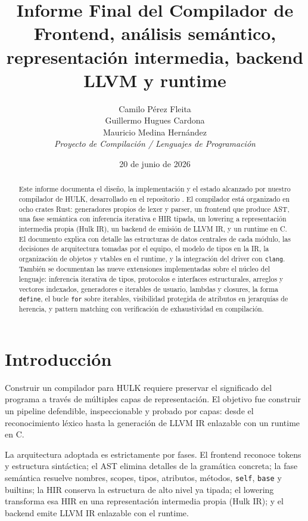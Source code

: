 \documentclass[12pt,letterpaper]{article}
\title{Informe Final del Compilador de \hulk{}\\
\large Frontend, análisis semántico, representación intermedia, backend LLVM y runtime}
\author{
Camilo Pérez Fleita\\
Guillermo Hugues Cardona\\
Mauricio Medina Hernández\\[0.5em]
\textit{Proyecto de Compilación / Lenguajes de Programación}
}
\date{20 de junio de 2026}
\newcommand{\repo}[1]{\texttt{\detokenize{#1}}}
\newcommand{\hulk}{\textsc{HULK}}
\newcommand{\src}[1]{\texttt{#1}}
\begin{document}
\maketitle

\begin{abstract}
Este informe documenta el diseño, la implementación y el estado alcanzado por nuestro compilador de \hulk{}, desarrollado en el repositorio \repo{mauricio04mh/hulk-compiler}. El compilador está organizado en ocho crates Rust: generadores propios de lexer y parser, un frontend que produce AST, una fase semántica con inferencia iterativa e HIR tipada, un lowering a representación intermedia propia (Hulk IR), un backend de emisión de LLVM IR, y un runtime en C. El documento explica con detalle las estructuras de datos centrales de cada módulo, las decisiones de arquitectura tomadas por el equipo, el modelo de tipos en la IR, la organización de objetos y vtables en el runtime, y la integración del driver con \src{clang}. También se documentan las nueve extensiones implementadas sobre el núcleo del lenguaje: inferencia iterativa de tipos, protocolos e interfaces estructurales, arreglos y vectores indexados, generadores e iterables de usuario, lambdas y closures, la forma \src{define}, el bucle \src{for} sobre iterables, visibilidad protegida de atributos en jerarquías de herencia, y pattern matching con verificación de exhaustividad en compilación.
\end{abstract}

\tableofcontents
\newpage

\section{Introducción}

Construir un compilador para \hulk{} requiere preservar el significado del programa a través de múltiples capas de representación. El objetivo fue construir un pipeline defendible, inspeccionable y probado por capas: desde el reconocimiento léxico hasta la generación de LLVM IR enlazable con un runtime en C.

La arquitectura adoptada es estrictamente por fases. El frontend reconoce tokens y estructura sintáctica; el AST elimina detalles de la gramática concreta; la fase semántica resuelve nombres, scopes, tipos, atributos, métodos, \src{self}, \src{base} y builtins; la HIR conserva la estructura de alto nivel ya tipada; el lowering transforma esa HIR en una representación intermedia propia (Hulk IR); y el backend emite LLVM IR enlazable con el runtime.
\end{document}
